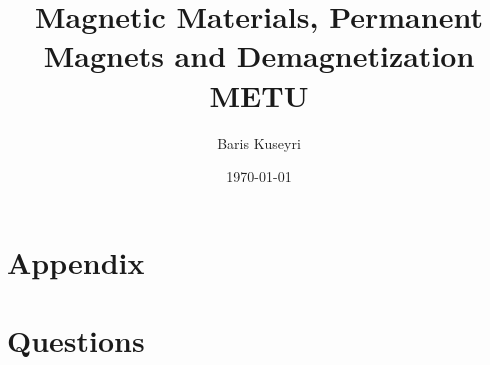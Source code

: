 \documentclass[10pt,twoside]{article}
\begin{document}
\title{
	{Magnetic Materials, Permanent Magnets and Demagnetization} \\
	{\large METU} \\
	}
\author{Baris Kuseyri}
\date{\today}
\maketitle

\tableofcontents
\newpage






\appendix
\section{Appendix}


\section{Questions}



\newpage
\printbibliography
\end{document}
